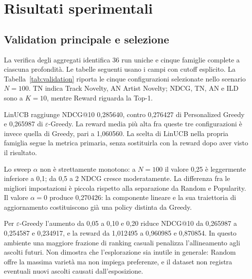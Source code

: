 \chapter{Risultati sperimentali}\label{ch:risultati}
\section{Validation principale e selezione}
La verifica degli aggregati identifica 36 run uniche e cinque famiglie complete a ciascuna profondità. Le tabelle seguenti usano i campi con cutoff esplicito. La Tabella~\ref{tab:validation} riporta le cinque configurazioni selezionate nello scenario $N=100$. TN indica Track Novelty, AN Artist Novelty; NDCG, TN, AN e ILD sono a $K=10$, mentre Reward riguarda la Top-1.

\begin{table}[htbp]\centering\footnotesize

\caption{Validation a $N=100$: $\varepsilon=0{,}05$, $\alpha=2$. Metriche a @10, reward Top-1.}\label{tab:validation}
\end{table}

LinUCB raggiunge NDCG@10 0,285640, contro 0,276427 di Personalized Greedy e 0,265987 di $\varepsilon$-Greedy. La reward media più alta fra queste tre configurazioni è invece quella di Greedy, pari a 1,060560. La scelta di LinUCB nella propria famiglia segue la metrica primaria, senza sostituirla con la reward dopo aver visto il risultato.

Lo sweep $\alpha$ non è strettamente monotono: a $N=100$ il valore 0,25 è leggermente inferiore a 0,1; da 0,5 a 2 NDCG cresce moderatamente. La differenza fra le migliori impostazioni è piccola rispetto alla separazione da Random e Popularity. Il valore $\alpha=0$ produce 0,270426: la componente lineare e la sua traiettoria di aggiornamento costituiscono già una policy distinta da Greedy.

Per $\varepsilon$-Greedy l'aumento da 0,05 a 0,10 e 0,20 riduce NDCG@10 da 0,265987 a 0,254587 e 0,234917, e la reward da 1,012495 a 0,960985 e 0,870854. In questo ambiente una maggiore frazione di ranking casuali penalizza l'allineamento agli ascolti futuri. Non dimostra che l'esplorazione sia inutile in generale: Random offre la massima varietà ma non impiega preferenze, e il dataset non registra eventuali nuovi ascolti causati dall'esposizione.


